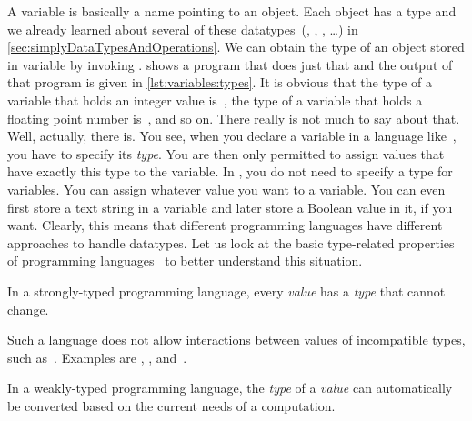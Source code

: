 %
\label{sec:variableTypesAndTypeHints}%
%
%
%
%
%
A variable is basically a name pointing to an object.
Each object has a type and we already learned about several of these datatypes~(, , , \dots) in \cref{sec:simplyDataTypesAndOperations}.
We can obtain the type of an object stored in variable  by invoking .
 shows a program that does just that and the output of that program is given in \cref{lst:variables:types}.
It is obvious that the type of a variable that holds an integer value is~, the type of a variable that holds a floating point number is~, and so on.
There really is not much to say about that.%
\endhsection%
%
%
\label{sec:typesAndConfusion}%
\FloatBarrier%
%
%
%
%
Well, actually, there is.
You see, when you declare a variable in a language like~, you have to specify its \emph{type}.
You are then only permitted to assign values that have exactly this type to the variable.
In \python, you do not need to specify a type for variables.
You can assign whatever value you want to a variable.
You can even first store a text string in a variable and later store a Boolean value in it, if you want.
Clearly, this means that different programming languages have different approaches to handle datatypes.
Let us look at the basic type-related properties of programming languages~\cite{PSF:TPW:WIPADLAAASTL} to better understand this situation.%
%
\begin{definition}%
In a strongly-typed programming language, every \emph{value} has a \emph{type} that cannot change.%
\end{definition}%
%
Such a language does not allow interactions between values of incompatible types, such as~.
Examples are \python, , and~.%
%
\begin{definition}%
In a weakly-typed programming language, the \emph{type} of a \emph{value} can automatically be converted based on the current needs of a computation.%
\end{definition}%
